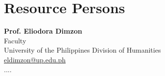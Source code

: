 %
%
%                 

\section{Resource Persons}
\label{sec:appendixb}

%
%
%
%

%
%

\newcommand{\resperson}[4]{\textbf{#1} \\ #2 \\ #3 \\ \url{#4}\vspace{0.5em}\\}

\resperson{Prof. Eliodora Dimzon}{Faculty}{University of the Philippines Division of Humanities}{eldimzon@up.edu.ph}
....


